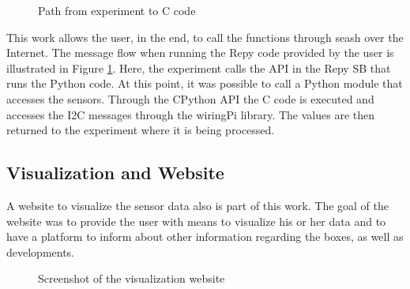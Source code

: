 \documentclass{article}      %
\begin{document}
\begin{figure}[ht]
	\caption{Path from experiment to C code}
	\label{fig:cPython}
\end{figure}

This work allows the user, in the end, to call the functions through \gls{seash} over the Internet. The message flow when running the \gls{Repy} code provided by the user is illustrated in Figure \ref{fig:cPython}. Here, the experiment calls the \gls{API} in the \gls{Repy} \gls{SB} that runs the Python code. At this point, it was possible to call a Python module that accesses the sensors. Through the CPython \gls{API} the C code is executed and accesses the \gls{I2C} messages through the wiringPi library. The values are then returned to the experiment where it is being processed.

\subsection{Visualization and Website}

A website to visualize the sensor data also is part of this work. The goal of the website was to provide the user with means to visualize his or her data and to have a platform to inform about other information regarding the boxes, as well as developments.

\begin{figure}[ht]
	\caption{Screenshot of the visualization website}
	\label{fig:website}
\end{figure}
\end{document}
